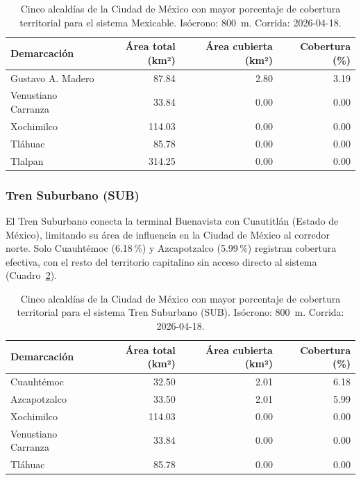 \begin{table}[H]
    \centering
    \caption[Alcaldías con mayor cobertura de Mexicable (CDMX)]{
    Cinco alcaldías de la Ciudad de México con mayor porcentaje de cobertura
    territorial para el sistema Mexicable. Isócrono: 800~m.
    Corrida: 2026-04-18.}
    \label{tab:cobertura-mexicable-cdmx}
    \begin{tabular}{|l|r|r|r|}
        \hline
        \textbf{Demarcación} & \textbf{Área total (km²)} & \textbf{Área cubierta (km²)} & \textbf{Cobertura (\%)} \\
        \hline
        Gustavo A. Madero   &  87.84 & 2.80 & 3.19 \\
        Venustiano Carranza &  33.84 & 0.00 & 0.00 \\
        Xochimilco          & 114.03 & 0.00 & 0.00 \\
        Tláhuac             &  85.78 & 0.00 & 0.00 \\
        Tlalpan             & 314.25 & 0.00 & 0.00 \\
        \hline
    \end{tabular}
\end{table}

\subsubsection{Tren Suburbano (SUB)}
\label{subsubsec:cobertura-sub}

El Tren Suburbano conecta la terminal Buenavista con Cuautitlán (Estado de
México), limitando su área de influencia en la Ciudad de México al corredor
norte. Solo Cuauhtémoc (6.18\,\%) y Azcapotzalco (5.99\,\%) registran cobertura
efectiva, con el resto del territorio capitalino sin acceso directo al sistema
(Cuadro~\ref{tab:cobertura-sub-cdmx}).

\begin{table}[H]
    \centering
    \caption[Alcaldías con mayor cobertura de Tren Suburbano (CDMX)]{
    Cinco alcaldías de la Ciudad de México con mayor porcentaje de cobertura
    territorial para el sistema Tren Suburbano (SUB). Isócrono: 800~m.
    Corrida: 2026-04-18.}
    \label{tab:cobertura-sub-cdmx}
    \begin{tabular}{|l|r|r|r|}
        \hline
        \textbf{Demarcación} & \textbf{Área total (km²)} & \textbf{Área cubierta (km²)} & \textbf{Cobertura (\%)} \\
        \hline
        Cuauhtémoc          &  32.50 & 2.01 & 6.18 \\
        Azcapotzalco        &  33.50 & 2.01 & 5.99 \\
        Xochimilco          & 114.03 & 0.00 & 0.00 \\
        Venustiano Carranza &  33.84 & 0.00 & 0.00 \\
        Tláhuac             &  85.78 & 0.00 & 0.00 \\
        \hline
    \end{tabular}
\end{table}

